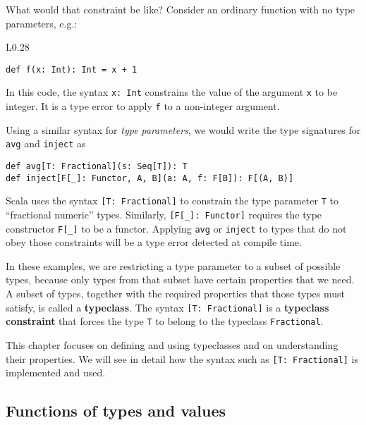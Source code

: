 What would that constraint be like? Consider an ordinary function
with no type parameters, e.g.:

\begin{wrapfigure}{L}{0.28\columnwidth}%
\vspace{-0.85\baselineskip}
\begin{lstlisting}
def f(x: Int): Int = x + 1
\end{lstlisting}

\vspace{-0.95\baselineskip}
\end{wrapfigure}%

\noindent In this code, the syntax \lstinline!x: Int! constrains
the value of the argument \lstinline!x! to be integer. It is a type
error to apply \lstinline!f! to a non-integer argument. 

Using a similar syntax for \emph{type} \emph{parameters}, we would
write the type signatures for \lstinline!avg! and \lstinline!inject!
as
\begin{lstlisting}
def avg[T: Fractional](s: Seq[T]): T
def inject[F[_]: Functor, A, B](a: A, f: F[B]): F[(A, B)]
\end{lstlisting}
Scala uses the syntax \lstinline![T: Fractional]! to constrain the
type parameter \lstinline!T! to \textsf{``}fractional numeric\textsf{''} types. Similarly,
\lstinline![F[_]: Functor]! requires the type constructor \lstinline!F[_]!
to be a functor. Applying \lstinline!avg! or \lstinline!inject!
to types that do not obey those constraints will be a type error detected
at compile time.

In these examples, we are restricting a type parameter to a subset
of possible types, because only types from that subset have certain
properties that we need. A subset of types, together with the required
properties that those types must satisfy, is called a \textbf{typeclass}.
The syntax \lstinline![T: Fractional]! is a \textbf{typeclass constraint}
that forces the type \lstinline!T! to belong to the typeclass \lstinline!Fractional!. 

This chapter focuses on defining and using typeclasses and on understanding
their properties. We will see in detail how the syntax such as \lstinline![T: Fractional]!
is implemented and used.

\subsection{Functions of types and values}

